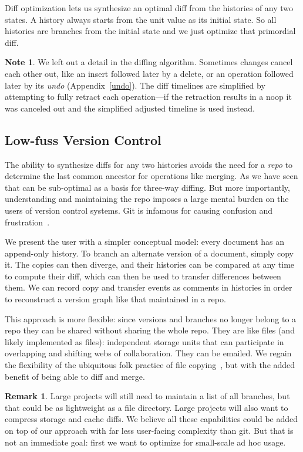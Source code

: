 \documentclass[english,submission]{programming}
\theoremstyle{definition}
\newtheorem*{remark}{Remark}
\newtheorem*{note}{Note}
\begin{document}
Diff optimization lets us synthesize an optimal diff from the histories of any two states. A history always starts from the unit value as its initial state. So all histories are branches from the initial state and we just optimize that primordial diff.

\begin{note}
  We left out a detail in the diffing algorithm. Sometimes changes cancel each other out, like an insert followed later by a delete, or an operation followed later by its \textit{undo} (Appendix~\ref{undo}). The diff timelines are simplified by attempting to fully retract each operation---if the retraction results in a \textsf{noop} it was canceled out and the simplified adjusted timeline is used instead.
\end{note}

\subsection{Low-fuss Version Control}

The ability to synthesize diffs for any two histories avoids the need for a \textit{repo} to determine the last common ancestor for operations like merging. As we have seen that can be sub-optimal as a basis for three-way diffing. But more importantly, understanding and maintaining the repo imposes a large mental burden on the users of version control systems. Git is infamous for causing confusion and frustration~\cite{perez13, church2014case, xkcd1597}.

We present the user with a simpler conceptual model: every document has an append-only history. To branch an alternate version of a document, simply copy it. The copies can then diverge, and their histories can be compared at any time to compute their diff, which can then be used to transfer differences between them. We can record copy and transfer events as comments in histories in order to reconstruct a version graph like that maintained in a repo.

This approach is more flexible: since versions and branches no longer belong to a repo they can be shared without sharing the whole repo. They are like files (and likely implemented as files): independent storage units that can participate in overlapping and shifting webs of collaboration. They can be emailed. We regain the flexibility of the ubiquitous folk practice of file copying~\cite{Burnett14, Basman19}, but with the added benefit of being able to diff and merge.

\begin{remark}
  Large projects will still need to maintain a list of all branches, but that could be as lightweight as a file directory. Large projects will also want to compress storage and cache diffs. We believe all these capabilities could be added on top of our approach with far less user-facing complexity than git. But that is not an immediate goal: first we want to optimize for small-scale ad hoc usage.
\end{remark}
\end{document}
